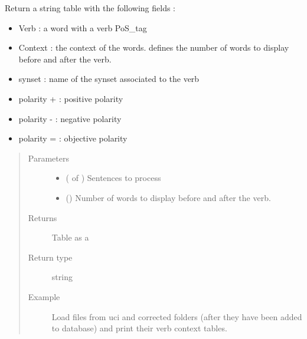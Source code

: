 \documentclass[letterpaper,10pt,english]{sphinxmanual}
\begin{document}
\begin{fulllineitems}
\label{\detokenize{analysis:loacore.analysis.pattern_recognition.verb_context_table}}
Return a string table with the following fields :
\begin{itemize}
\item {} 
Verb : a word with a verb PoS\_tag

\item {} 
Context : the context of the words.  defines the number of words to display before and after
the verb.

\item {} 
synset : name of the synset associated to the verb

\item {} 
polarity + : positive polarity

\item {} 
polarity - : negative polarity

\item {} 
polarity = : objective polarity

\end{itemize}
\begin{quote}\begin{description}
\item[{Parameters}] \leavevmode\begin{itemize}
\item {} 
 ( of ) \textendash{} Sentences to process

\item {} 
 () \textendash{} Number of words to display before and after the verb.

\end{itemize}

\item[{Returns}] \leavevmode
Table as a 

\item[{Return type}] \leavevmode
string

\item[{Example}] \leavevmode
Load files from uci and corrected folders (after they have been added to database) and print their verb context
tables.


\end{description}
\end{quote}
\end{fulllineitems}
\end{document}
